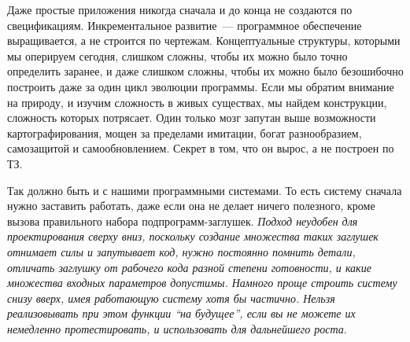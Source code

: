 Даже простые приложения никогда сначала и до конца не создаются по
свецификациям. Инкрементальное развитие\ --- программное обеспечение
выращивается, а не строится по чертежам. Концептуальные структуры, которыми мы
оперируем сегодня, слишком сложны, чтобы их можно было точно определить заранее,
и даже слишком сложны, чтобы их можно было безошибочно построить даже за один
цикл эволюции программы. Если мы обратим внимание на природу, и изучим сложность
в живых существах, мы найдем конструкции, сложность которых потрясает. Один
только мозг запутан выше возможности картографирования, мощен за пределами
имитации, богат разнообразием, самозащитой и самообновлением. Секрет в том, что
он вырос, а не построен по ТЗ.

Так должно быть и с нашими программными системами. То есть систему сначала нужно
заставить работать, даже если она не делает ничего полезного, кроме вызова
правильного набора подпрограмм-заглушек. \textit{Подход неудобен для
проектирования сверху вниз, поскольку создание множества таких заглушек отнимает
силы и запутывает код, нужно постоянно помнить детали, отличать заглушку от
рабочего кода разной степени готовности, и какие множества входных параметров
допустимы. Намного проще строить систему снизу вверх, имея работающую систему
хотя бы частично. Нельзя реализовывать при этом функции ``на будущее'', если вы
не можете их немедленно протестировать, и использовать для дальнейшего роста}.
